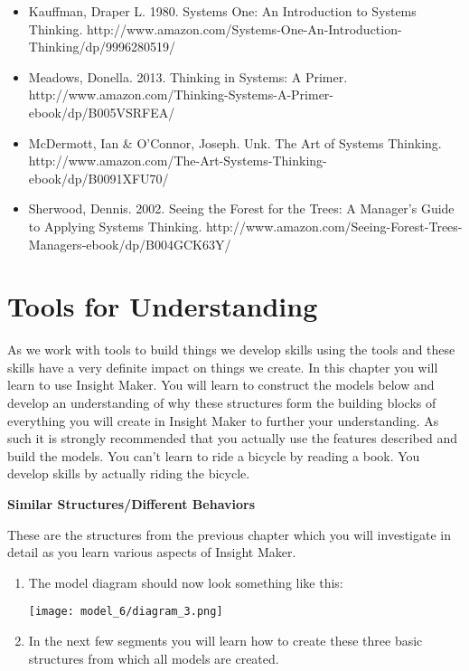 \documentclass[]{memoir}
\makeatletter
\def\maxwidth{\ifdim\Gin@nat@width>\linewidth\linewidth
\else\Gin@nat@width\fi}
\let\Oldincludegraphics\includegraphics
\renewcommand{\includegraphics}[1]{\Oldincludegraphics[width=\maxwidth]{#1}}
\makeatother
\begin{document}
\begin{itemize}
\itemsep1pt\parskip0pt
\item
  Kauffman, Draper L. 1980. Systems One: An Introduction to Systems
  Thinking.
  http://www.amazon.com/Systems-One-An-Introduction-Thinking/dp/9996280519/
\item
  Meadows, Donella. 2013. Thinking in Systems: A Primer.
  http://www.amazon.com/Thinking-Systems-A-Primer-ebook/dp/B005VSRFEA/
\item
  McDermott, Ian \& O'Connor, Joseph. Unk. The Art of Systems Thinking.
  http://www.amazon.com/The-Art-Systems-Thinking-ebook/dp/B0091XFU70/
\item
  Sherwood, Dennis. 2002. Seeing the Forest for the Trees: A Manager's
  Guide to Applying Systems Thinking.
  http://www.amazon.com/Seeing-Forest-Trees-Managers-ebook/dp/B004GCK63Y/
\end{itemize}

\chapter{Tools for Understanding}

As we work with tools to build things we develop skills using the tools
and these skills have a very definite impact on things we create. In
this chapter you will learn to use Insight Maker. You will learn to
construct the models below and develop an understanding of why these
structures form the building blocks of everything you will create in
Insight Maker to further your understanding. As such it is strongly
recommended that you actually use the features described and build the
models. You can't learn to ride a bicycle by reading a book. You develop
skills by actually riding the bicycle.

\FloatBarrier 

\begin{oframed}\textbf{Similar Structures/Different Behaviors} 

 These are the structures from the previous chapter which you will investigate in detail as you learn various aspects of Insight Maker.

\begin{enumerate}
\item The model diagram should now look something like this: \par \begin{minipage}{\linewidth}  \centering \texttt{[image: model\_6/diagram\_3.png]}
\end{minipage}
\item 

In the next few segments you will learn how to create these three basic structures from which all models are created.



\end{enumerate} \end{oframed}
\end{document}
